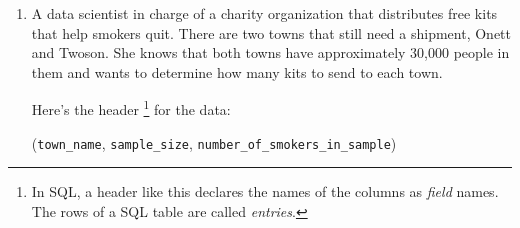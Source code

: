 \documentclass{ccg-topic}
\begin{document}
\begin{enumerate}
\begin{enumerate}
\item ($1/2$ point) What relevant mathematical information is as \emph{known} in this problem?%
\footnote{%
Hint: What is known should help you determine whether it is more appropriate to use the standard normal distribution or one of Student's $t$-distributions to determine the optimal sample size.
}


\vfill
\item ($1/2$ point) What relevant mathematical parameters are \emph{unknown} in this problem?%
\footnote{%
Hint: Draw and label the probability distribution that is most appropriate to use. What should the labels be?
}


\vfill 
\item ($1/2$ point) What mathematical relation,%
    \footnote{%
    For example, a ``mathematical relationship'' could be in the form of an equation or an approximation.
    }
if any, exists between the unknown parameters and the known information?

\vfill 

\item ($1/2$ point) Exploit the relationship between the known information to determine the unknown parameters, then provide a numerical answer to the question: What sample size will ensure that this researcher's margin of error is bounded by $0.038$, regardless of what sample proportion value occurs once they gather the sample?

\vfill
\end{enumerate}

\item A data scientist in charge of a charity organization that distributes free kits that help smokers quit. There are two towns that still need a shipment, Onett and Twoson. She knows that both towns have approximately 30,000 people in them and wants to determine how many kits to send to each town.

Here's the header%
    \footnote{%
    In SQL, a header like this declares the names of the columns as \emph{field} names. The rows of a SQL table are called \emph{entries}.
    }
for the data: 

\begin{center}
    (\texttt{town\_name}, \texttt{sample\_size}, \texttt{number\_of\_smokers\_in\_sample})
\end{center}


\end{enumerate}
\end{document}
